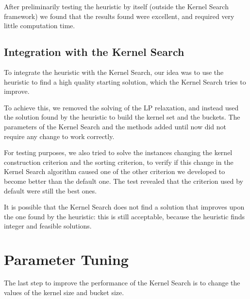 After preliminarily testing the heuristic by itself (outside the Kernel Search framework)
we found that the results found were excellent, and required very little computation time.

\subsection{Integration with the Kernel Search}
To integrate the heuristic with the Kernel Search, our idea was to use the heuristic
to find a high quality starting solution, which the Kernel Search tries to improve.

To achieve this, we removed the solving of the LP relaxation, and instead
used the solution found by the heuristic to build the kernel set and the buckets.
The parameters of the Kernel Search and the methods added until now
did not require any change to work correctly.

For testing purposes, we also tried to solve the instances changing the kernel construction
criterion and the sorting criterion, to verify if this change in the
Kernel Search algorithm caused one of the other criterion we developed
to become better than the default one.
The test revealed that the criterion used by default were still the best ones.

It is possible that the Kernel Search does not find a solution that improves
upon the one found by the heuristic: this is still acceptable, because the
heuristic finds integer and feasible solutions.


\section{Parameter Tuning}
The last step to improve the performance of the Kernel Search is to
change the values of the kernel size and bucket size.